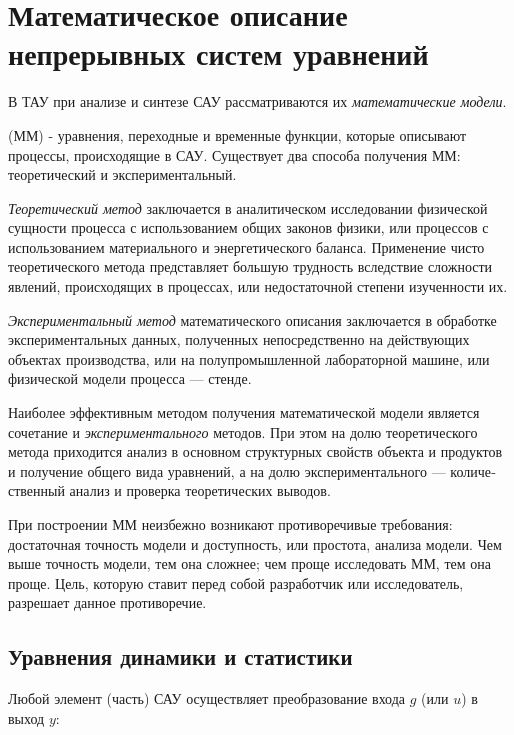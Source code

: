 \documentclass[../../TAU.tex]{subfiles}
\begin{document}
\chapter{Математическое описание непрерывных систем уравнений} %

    В ТАУ при анализе и синтезе САУ рассматриваются их {\it математические модели}.

     (ММ) - уравнения, переходные и временные функции, которые описывают процессы, происходящие в САУ.
    Существует два способа получения ММ: теоретический и экспериментальный.\par
    
    {\it Теоретический метод} заключается в аналитическом исследовании физической сущности процесса с использованием общих законов физики, или процессов с использованием материального и энергетического баланса. Применение чисто теоретического метода представляет большую трудность вследствие сложности явлений, происходящих в процессах, или недостаточной степени изученности их.
    
    {\it Экспериментальный метод} математического описания заклю­чается в обработке экспериментальных данных, полученных непо­средственно на действующих объектах производства, или на полу­промышленной лабораторной машине, или физической модели про­цесса — стенде.\par
    Наиболее эффективным методом получения математической модели является сочетание {} и {\it экспериментального} ме­тодов. При этом на долю теоретического метода приходится анализ в основном структурных свойств объекта и продуктов и получение общего вида уравнений, а на долю экспериментального — количе­ственный анализ и проверка теоретических выводов.\par
    При построении ММ неизбежно возникают противоречивые требования: достаточная точность модели и доступность, или простота, анализа модели. Чем выше точность модели, тем она сложнее; чем проще исследовать ММ, тем она проще. Цель, которую ставит перед собой разработчик или исследователь, разрешает данное противоречие. 




\section{Уравнения динамики и статистики} %

    Любой элемент (часть) САУ осуществляет преобразование входа 
    $g$ (или $u$) в выход $y$:
    
\end{document}
